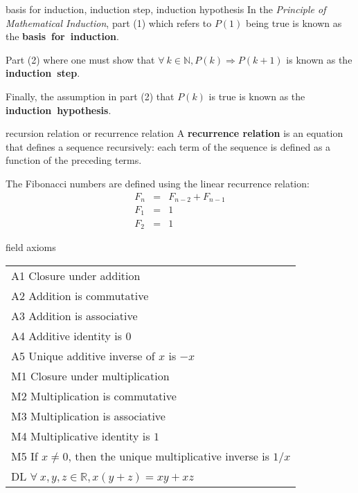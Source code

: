 \documentclass[avery5371,grid]{flashcards}
\newcommand{\N}{\mathbb{N}}
\newcommand{\R}{\mathbb{R}}
\begin{document}
\begin{flashcard}[Definition]{basis for induction, induction step,
induction hypothesis}
In the \textit{Principle of Mathematical Induction}, part (1) which refers
to $P(1)$ being true is known as the \mbox{\textbf{basis for induction}}.

\bigskip
Part (2) where one must show that $\forall \ k \in \N, P(k)
\Rightarrow P(k+1)$ is known as the \mbox{\textbf{induction step}}.

\bigskip
Finally, the assumption in part (2) that $P(k)$ is true is known as the
\mbox{\textbf{induction hypothesis}}.
\end{flashcard}

\begin{flashcard}[Definition]{recursion relation or recurrence relation}
A \textbf{recurrence relation} is an equation that defines a sequence
recursively: each term of the sequence is defined as a function of the
preceding terms.

\medskip
The Fibonacci numbers are defined using the linear recurrence relation:
\begin{eqnarray*}
F_n &=& F_{n-2} + F_{n-1}\\
F_{1} &=& 1\\
F_{2} &=& 1
\end{eqnarray*}
\end{flashcard}


\begin{flashcard}[Axiom]{field axioms}
\begin{small}
\begin{center}
\begin{tabular}{l}
A1 Closure under addition \\
A2 Addition is commutative \\ 
A3 Addition is associative \\
A4 Additive identity is $0$ \\ 
A5 Unique additive inverse of $x$ is $-x$ \\
M1 Closure under multiplication \\
M2 Multiplication is commutative \\
M3 Multiplication is associative \\
M4 Multiplicative identity is $1$ \\
M5 If $x \neq 0$, then the unique multiplicative inverse is $1/x$ \\
DL $\forall \ x,y,z \in \R, x(y+z) = xy + xz$
\end{tabular}
\end{center}
\end{small}
\end{flashcard}
\end{document}
